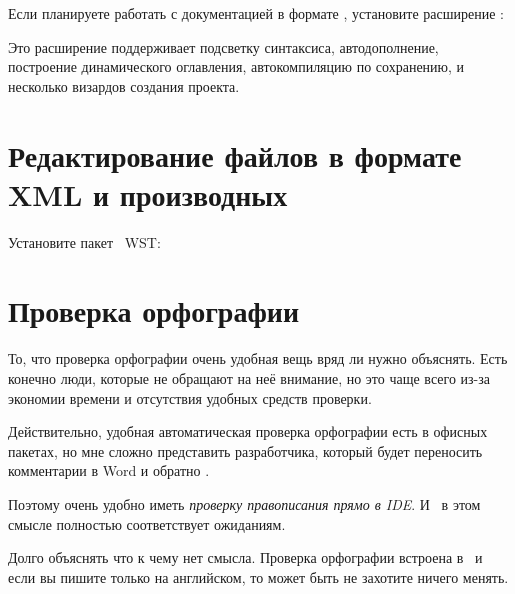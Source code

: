 Если планируете работать с документацией в формате \latex, установите расширение
\href{http://texlipse.sourceforge.net/}{}:
\bigskip







Это расширение поддерживает подсветку синтаксиса, автодополнение, построение
динамического оглавления, автокомпиляцию по сохранению, и несколько визардов
создания проекта.

\section{Редактирование файлов в формате XML и производных}

Установите пакет \eclipse\ WST:




\section{Проверка орфографии}


То, что проверка орфографии очень удобная вещь вряд ли нужно объяснять. Есть
конечно люди, которые не обращают на неё внимание, но это чаще всего из-за
экономии времени и отсутствия удобных средств проверки.

Действительно, удобная автоматическая проверка орфографии есть в офисных
пакетах, но мне сложно представить разработчика, который будет переносить
комментарии в Word и обратно \smiley.

Поэтому очень удобно иметь \emph{проверку правописания прямо в IDE}. И \eclipse\
в этом смысле полностью соответствует ожиданиям.

Долго объяснять что к чему нет смысла. Проверка орфографии встроена в \eclipse\
и если вы пишите только на английском, то может быть не захотите ничего менять.

